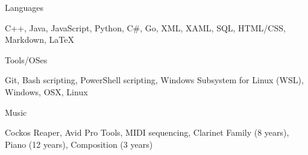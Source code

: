 \documentclass[]{awesome-cv}
\begin{document}
\vspace{-1mm}
\vspace{-2mm}
	\cventry
	{}
	{Languages}
	{}
	{}
	{\begin{cvitems}
		\vspace{-7mm}
		\item {C++, Java, JavaScript, Python, C\#, Go, XML, XAML, SQL, HTML/CSS, Markdown, LaTeX}
		\end{cvitems}}

	\vspace{-8mm}
	\cventry
	{}
	{Tools/OSes}
	{}
	{}
	{\begin{cvitems}
		\vspace{-7mm}
		\item {Git, Bash scripting, PowerShell scripting, Windows Subsystem for Linux (WSL), Windows, OSX, Linux}
		\end{cvitems}}
	
	\vspace{-8mm}
	\cventry
	{}
	{Music}
	{}
	{}
	{\begin{cvitems}
		\vspace{-7mm}
		\item {Cockos Reaper, Avid Pro Tools, MIDI sequencing, Clarinet Family (8 years), Piano (12 years), Composition (3 years)}
		\end{cvitems}}
	\vspace{-4mm}
\end{document}
